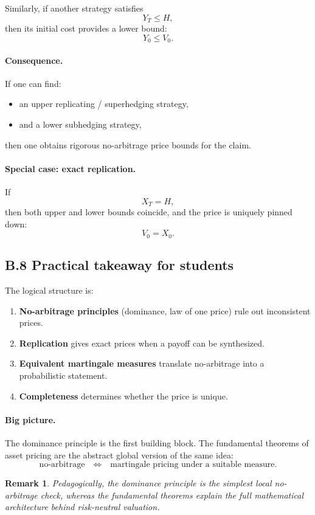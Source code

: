 \documentclass[11pt]{article}
\newcommand{\1}{\mathbf{1}}
\newtheorem{remark}{Remark}
\begin{document}
Similarly, if another strategy satisfies
$$
Y_T \le H,
$$
then its initial cost provides a lower bound:
$$
\boxed{\ Y_0 \le V_0. \ }
$$

\paragraph{Consequence.}
If one can find:
\begin{itemize}[leftmargin=1.4em]
    \item an upper replicating / superhedging strategy,
    \item and a lower subhedging strategy,
\end{itemize}
then one obtains rigorous no-arbitrage price bounds for the claim.

\paragraph{Special case: exact replication.}
If
$$
X_T=H,
$$
then both upper and lower bounds coincide, and the price is uniquely pinned down:
$$
V_0=X_0.
$$

\subsection*{B.8 Practical takeaway for students}

The logical structure is:

\begin{enumerate}[leftmargin=1.6em]
    \item \textbf{No-arbitrage principles} (dominance, law of one price) rule out inconsistent prices.
    \item \textbf{Replication} gives exact prices when a payoff can be synthesized.
    \item \textbf{Equivalent martingale measures} translate no-arbitrage into a probabilistic statement.
    \item \textbf{Completeness} determines whether the price is unique.
\end{enumerate}

\paragraph{Big picture.}
The dominance principle is the first building block.
The fundamental theorems of asset pricing are the abstract global version of the same idea:
$$
\text{no-arbitrage}
\quad \Longleftrightarrow \quad
\text{martingale pricing under a suitable measure.}
$$

\begin{remark}
Pedagogically, the dominance principle is the simplest local no-arbitrage check,
whereas the fundamental theorems explain the full mathematical architecture behind risk-neutral valuation.
\end{remark}
\end{document}
